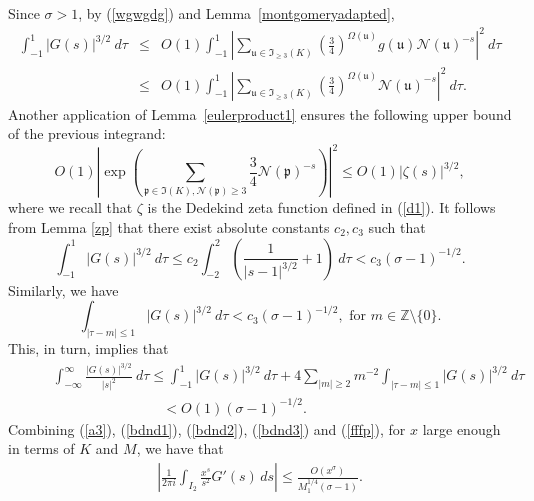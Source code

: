 \documentclass[11pt]{amsart}
\theoremstyle{definition}
\newcommand{\NN}{{\mathcal N}}
\newcommand{\Z}{{\mathbb Z}}
\newcommand{\mf}{\mathfrak}
\begin{document}
 Since $\sigma>1$, by (\ref{wgwgdg}) and Lemma~\ref{montgomeryadapted},
\begin{eqnarray*}
   \int_{-1}^1 |G(s)|^{3/2} \ d\tau  & \leq & O(1) \int_{-1}^1 \left| \sum_{\mf u \in  \mf I_{\geq 3}(K)} \left(\frac{3}{4}\right)^{\Omega(\mf u)}g(\mf u)\NN(\mf u)^{-s}\right|^2 \ d\tau \\
& \leq & O(1) \int_{-1}^1 \left| \sum_{\mf u \in \mf I_{\geq 3}(K)} \left(\frac{3}{4}\right)^{\Omega(\mf u)}\NN(\mf u)^{-s}\right|^2 \ d\tau.
\end{eqnarray*}
Another application of Lemma~\ref{eulerproduct1} ensures the following upper bound of the previous integrand:
\[
O(1) \left|\exp\left(\sum_{\mf p \in \mf I(K), \NN(\mf p) \geq 3} \frac{3}{4} \NN(\mf p)^{-s}\right)\right|^2 \leq O(1) |\zeta(s)|^{3/2},
\]
where we recall that $\zeta$ is the Dedekind zeta function defined in (\ref{d1}). %
It follows from Lemma \ref{zp} that there exist absolute constants $c_2, c_3$ such that
\[
\int_{-1}^1 |G(s)|^{3/2} \ d\tau \leq c_2\int_{-2}^2 \left(\frac{1}{|s-1|^{3/2}}+1\right) \ d\tau<c_3 (\sigma-1)^{-1/2}.
\]
Similarly, we have
\[
\int_{|\tau-m|\leq 1} |G(s)|^{3/2} \ d\tau<c_3(\sigma-1)^{-1/2}, \text{ for } m \in \Z \setminus \{0\}. 
\]
This, in turn, implies that   
\begin{equation}\label{fffp}
    \begin{split}
   &\qquad \int_{-\infty}^{\infty} \frac{|G(s)|^{3/2}}{|s|^{2}} \ d\tau  \leq  \int_{-1}^1 |G(s)|^{3/2}\ d\tau +4 \sum_{|m| \geq 2} m^{-2} \int_{|\tau-m|\leq 1} |G(s)|^{3/2} \ d\tau\\& \qquad\qquad\qquad\qquad\;\;\;\quad < O(1)(\sigma-1)^{-1/2}.
   \end{split}
\end{equation}
Combining (\ref{a3}), (\ref{bdnd1}), (\ref{bdnd2}), (\ref{bdnd3}) and (\ref{fffp}),
 for $x$ large enough in terms of $K$ and $M$, we have that  
   \begin{equation}\label{e2}
    \begin{split}
        \left|\frac{1}{2\pi i}\int_{I_{2}}\frac{x^{s}}{s^{2}}G'(s)\,ds\right|\leq \frac{O(x^{\sigma})}{M_{1}^{1/4}(\sigma-1)}.
    \end{split}
 \end{equation}
\end{document}
